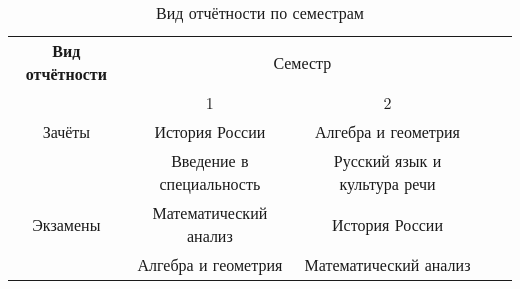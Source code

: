 \documentclass{article}
\begin{document}
\begin{table}[h!]
    \centering
    \begin{tabular}{|c|c|c|c|c|}
        	\hline
        	\textbf{Вид отчётности} & \multicolumn{2}{|c|}{Семестр} \\
	\cline{2-3}
	  & 1 & 2 \\
        	\hline
        	 Зачёты & История России & Алгебра и геометрия \\
		\cline{2-3}
               	& Введение в специальность & Русский язык и культура речи \\
        	\hline
        	Экзамены & Математический анализ & История России \\
		\cline{2-3}
                 	& Алгебра и геометрия & Математический анализ \\
        \hline
    \end{tabular}
    \caption{Вид отчётности по семестрам}
\end{table}
\end{document}
